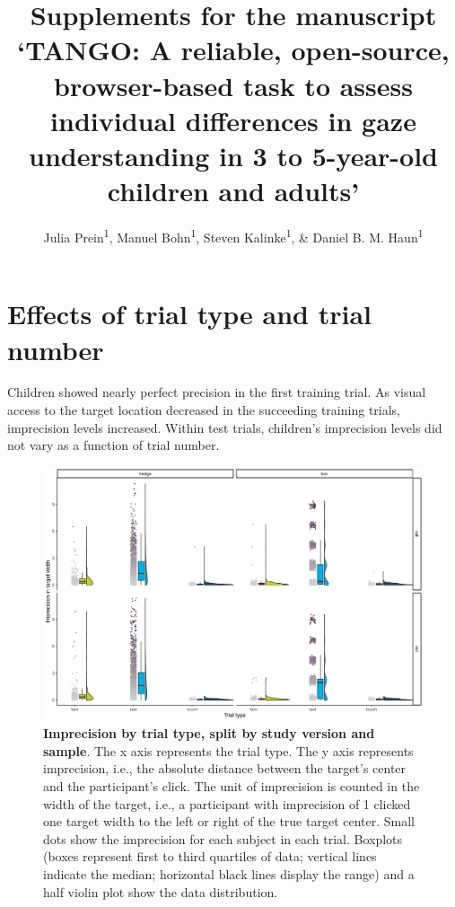 \documentclass[
  man,floatsintext]{apa6}
\title{Supplements for the manuscript `TANGO: A reliable, open-source, browser-based task to assess individual differences in gaze understanding in 3 to 5-year-old children and adults'}
\author{Julia Prein\textsuperscript{1}, Manuel Bohn\textsuperscript{1}, Steven Kalinke\textsuperscript{1}, \& Daniel B. M. Haun\textsuperscript{1}}
\date{}
\affiliation{\vspace{0.5cm}\textsuperscript{1} Department of Comparative Cultural Psychology, Max Planck Institute for Evolutionary Anthropology, Leipzig, Germany}
\begin{document}
\maketitle

\hypertarget{effects-of-trial-type-and-trial-number}{%
\section{Effects of trial type and trial number}\label{effects-of-trial-type-and-trial-number}}

Children showed nearly perfect precision in the first training trial. As visual access to the target location decreased in the succeeding training trials, imprecision levels increased. Within test trials, children's imprecision levels did not vary as a function of trial number.



\begin{figure}

{\centering \includegraphics[width=1\linewidth]{../figures/tango_supplements_trainingtrials} 

}

\caption{\textbf{Imprecision by trial type, split by study version and sample}. The x axis represents the trial type. The y axis represents imprecision, i.e., the absolute distance between the target's center and the participant's click. The unit of imprecision is counted in the width of the target, i.e., a participant with imprecision of 1 clicked one target width to the left or right of the true target center. Small dots show the imprecision for each subject in each trial. Boxplots (boxes represent first to third quartiles of data; vertical lines indicate the median; horizontal black lines display the range) and a half violin plot show the data distribution.}\label{fig:fig1}
\end{figure}
\end{document}
